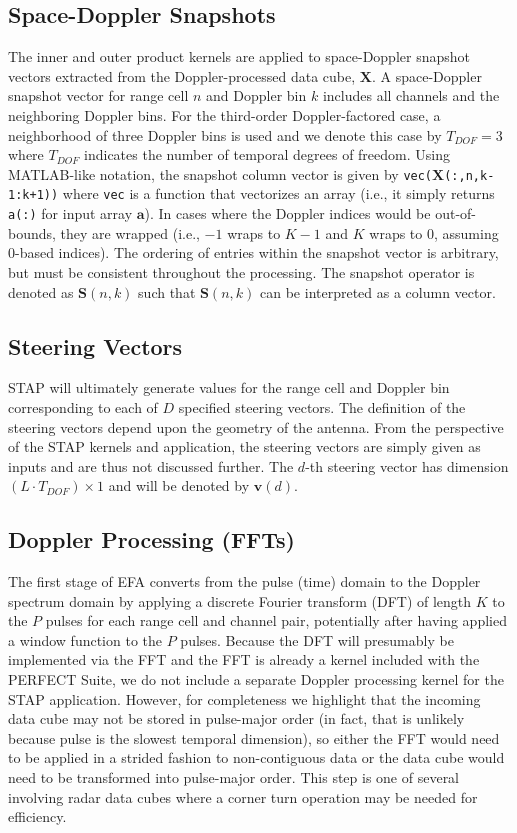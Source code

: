 \documentclass{report}
\begin{document}
\subsection{Space-Doppler Snapshots}

The inner and outer product kernels are applied to space-Doppler
snapshot vectors extracted from the Doppler-processed data cube, $\mathbf{X}$.
A space-Doppler snapshot vector for range cell $n$ and Doppler bin $k$
includes all channels and the neighboring Doppler bins.
For the third-order Doppler-factored case, a neighborhood of three
Doppler bins is used and we denote this case by $T_{DOF}=3$ where
$T_{DOF}$ indicates the number of temporal degrees of freedom.
Using MATLAB-like notation, the snapshot column vector is
given by \texttt{vec($\mathbf{X}$(:,n,k-1:k+1))} where \texttt{vec} is
a function that vectorizes an array (i.e., it simply returns
\texttt{a(:)} for input array $\mathbf{a}$).
In cases where the Doppler indices would be out-of-bounds, they are
wrapped (i.e., $-1$ wraps to $K-1$ and $K$ wraps to 0, assuming
0-based indices).
The ordering of entries within the snapshot vector is arbitrary,
but must be consistent throughout the processing.
The snapshot operator is denoted as $\mathbf{S}(n,k)$ such that
$\mathbf{S}(n,k)$ can be interpreted as a column vector.

\subsection{Steering Vectors}

STAP will ultimately generate values for the range cell and Doppler
bin corresponding to each of $D$ specified steering vectors.
The definition of the steering vectors depend upon the geometry
of the antenna.
From the perspective of the STAP kernels and application, the steering
vectors are simply given as inputs and are thus not discussed further.
The $d$-th steering vector has dimension $(L \cdot T_{DOF}) \times 1$
and will be denoted by $\mathbf{v}(d)$.

\subsection{Doppler Processing (FFTs)}
\label{sec:stap:doppler}

The first stage of EFA converts from the pulse (time) domain to the
Doppler spectrum domain by applying a discrete Fourier transform (DFT) of
length $K$ to the $P$ pulses for each range cell and channel pair,
potentially after having applied a window function to the $P$ pulses.
Because the DFT will presumably be implemented via the FFT and the
FFT is already a kernel included with the PERFECT Suite, we do not
include a separate Doppler processing kernel for the STAP application.
However, for completeness we highlight that the incoming data cube
may not be stored in pulse-major order (in fact, that is unlikely
because pulse is the slowest temporal dimension), so either the
FFT would need to be applied in a strided fashion to non-contiguous
data or the data cube would need to be transformed into
pulse-major order.
This step is one of several involving radar data cubes where a
corner turn operation may be needed for efficiency.
\end{document}
